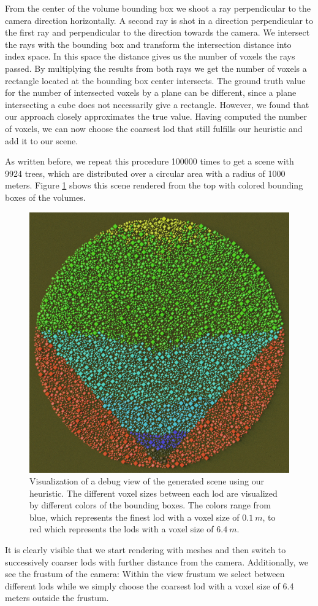 From the center of the volume bounding box we shoot a ray perpendicular to the camera direction horizontally.
A second ray is shot in a direction perpendicular to the first ray and perpendicular to the direction towards the camera.
We intersect the rays with the bounding box and transform the intersection distance into index space.
In this space the distance gives us the number of voxels the rays passed.
By multiplying the results from both rays we get the number of voxels a rectangle located at the bounding box center intersects.
The ground truth value for the number of intersected voxels by a plane can be different, since a plane intersecting a cube does not necessarily give a rectangle.
However, we found that our approach closely approximates the true value.
Having computed the number of voxels, we can now choose the coarsest \ac{lod} that still fulfills our heuristic and add it to our scene.

As written before, we repeat this procedure 100000 times to get a scene with 9924 trees, which are distributed over a circular area with a radius of 1000 meters.
Figure \ref{fig:visualize_lods} shows this scene rendered from the top with colored bounding boxes of the volumes.
\begin{figure}[ht]
    \centering
    \includegraphics[width=0.5\linewidth]{img/visualize_lods.jpg}
    \caption[Visualization of a \ac{lod} scene]{Visualization of a debug view of the generated scene using our heuristic. The different voxel sizes between each \ac{lod} are visualized by different colors of the bounding boxes. The colors range from blue, which represents the finest \ac{lod} with a voxel size of $\SI{0.1}{m}$, to red which represents the \acsp{lod} with a voxel size of $\SI{6.4}{m}$.}
    \label{fig:visualize_lods}
\end{figure}
It is clearly visible that we start rendering with meshes and then switch to successively coarser \acsp{lod} with further distance from the camera.
Additionally, we see the frustum of the camera: Within the view frustum we select between different \acsp{lod} while we simply choose the coarsest \ac{lod} with a voxel size of 6.4 meters outside the frustum.


